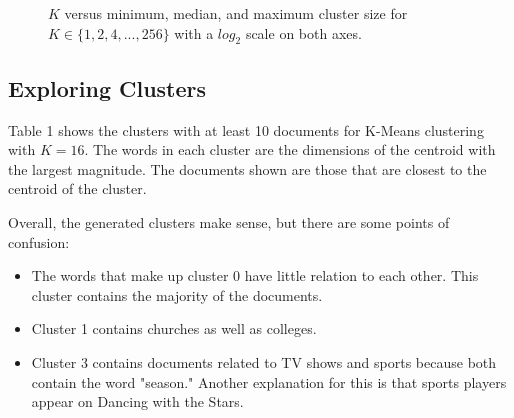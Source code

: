 \documentclass{article} %
\begin{document}
\begin{figure}[h]
\begin{center}
\end{center}
\caption{$K$ versus minimum, median, and maximum cluster size for $K \in \{1,2,4,...,256\}$ with a $log_{2}$ scale on both axes.}
\end{figure}

\subsection{Exploring Clusters}

Table 1 shows the clusters with at least 10 documents for K-Means clustering with $K=16$. The words in each cluster are the dimensions of the centroid with the largest magnitude. The documents shown are those that are closest to the centroid of the cluster. 

Overall, the generated clusters make sense, but there are some points of confusion:

\begin{itemize}
\item The words that make up cluster 0 have little relation to each other. This cluster contains the majority of the documents.
\item Cluster 1 contains churches as well as colleges.
\item Cluster 3 contains documents related to TV shows and sports because both contain the word "season." Another explanation for this is that sports players appear on Dancing with the Stars.
\end{itemize}
\end{document}
